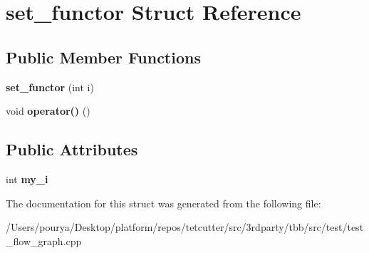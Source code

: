 \hypertarget{structset__functor}{}\section{set\+\_\+functor Struct Reference}
\label{structset__functor}
\subsection*{Public Member Functions}
\begin{DoxyCompactItemize}
\item 
\hypertarget{structset__functor_a3b00f49fdb5836c679aeea81c95f388c}{}{\bfseries set\+\_\+functor} (int i)\label{structset__functor_a3b00f49fdb5836c679aeea81c95f388c}

\item 
\hypertarget{structset__functor_ac144e7019baaaa4cd5e2cc1608b40726}{}void {\bfseries operator()} ()\label{structset__functor_ac144e7019baaaa4cd5e2cc1608b40726}

\end{DoxyCompactItemize}
\subsection*{Public Attributes}
\begin{DoxyCompactItemize}
\item 
\hypertarget{structset__functor_ae0b893f86f4fbcf9e46c4efea93e92ce}{}int {\bfseries my\+\_\+i}\label{structset__functor_ae0b893f86f4fbcf9e46c4efea93e92ce}

\end{DoxyCompactItemize}


The documentation for this struct was generated from the following file\+:\begin{DoxyCompactItemize}
\item 
/\+Users/pourya/\+Desktop/platform/repos/tetcutter/src/3rdparty/tbb/src/test/test\+\_\+flow\+\_\+graph.\+cpp\end{DoxyCompactItemize}
